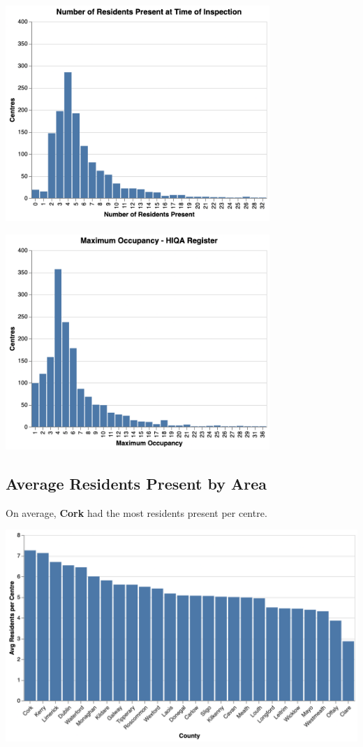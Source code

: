\documentclass[a4paper,11pt,twoside]{article}
\begin{document}
\begin{center}
\includegraphics[width=10cm]{img/03_no_residents_dist.png}
\end{center}
\begin{center}
\includegraphics[width=10cm]{img/04_max_occupancy_dist.png}
\end{center}
\subsection{Average Residents Present by Area}
\label{sec:org9965c4f}

On average, \textbf{Cork} had the most residents present per centre.

\begin{center}
\includegraphics[width=.9\linewidth]{img/06_01_avg_res_per_centre.png}
\end{center}
\end{document}
